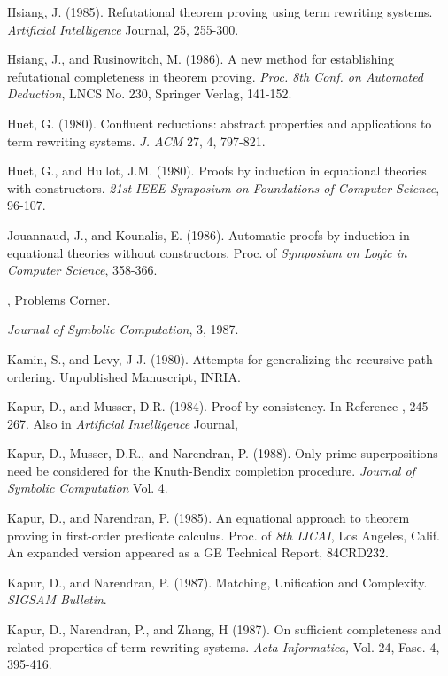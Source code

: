 \begin{thebibliography}{99}
Hsiang, J. (1985). Refutational theorem proving
using term rewriting systems. {\em Artificial Intelligence} Journal,
25, 255-300.

 Hsiang, J., and Rusinowitch, M. (1986). A new method for 
establishing refutational completeness in theorem proving.
{\em Proc. 8th Conf. on Automated Deduction},
LNCS No. 230, Springer Verlag, 141-152.

Huet, G. (1980). Confluent reductions: abstract
properties and applications to term rewriting systems. {\em J. ACM}
27, 4, 797-821.

Huet, G., and Hullot, J.M. (1980). Proofs by
induction in equational theories with constructors.  {\em 21st IEEE
Symposium on Foundations of Computer Science}, 96-107.

Jouannaud, J., and Kounalis, E. (1986).
Automatic proofs by induction in equational theories without
constructors.  Proc. of {\em Symposium on Logic in Computer Science},
358-366.

, Problems Corner.
 
 {\em Journal of Symbolic Computation}, 3, 1987.

Kamin, S., and Levy, J-J. (1980). Attempts for
generalizing the recursive path ordering. Unpublished Manuscript,
INRIA.

Kapur, D., and Musser, D.R. (1984). Proof by
consistency.  In Reference \cite{Guttagetal84}, 245-267.
Also in {\em Artificial Intelligence} Journal, 

Kapur, D., Musser, D.R., and Narendran, P. (1988). Only
prime superpositions need be considered for the Knuth-Bendix
completion procedure.  
{\em Journal of Symbolic Computation} Vol. 4.
 
Kapur, D., and Narendran, P. (1985).
An equational approach to theorem proving in first-order
predicate calculus. Proc. of {\em 8th IJCAI}, Los Angeles, Calif.
An expanded version appeared as a GE Technical Report, 84CRD232.

 Kapur, D., and Narendran, P. (1987). Matching, Unification and
Complexity. {\em SIGSAM Bulletin}.

Kapur, D., Narendran, P., and Zhang, H (1987). On
sufficient completeness and related properties of term rewriting
systems. 
{\em Acta Informatica,} Vol. 24, Fasc. 4, 395-416.


\end{thebibliography}

